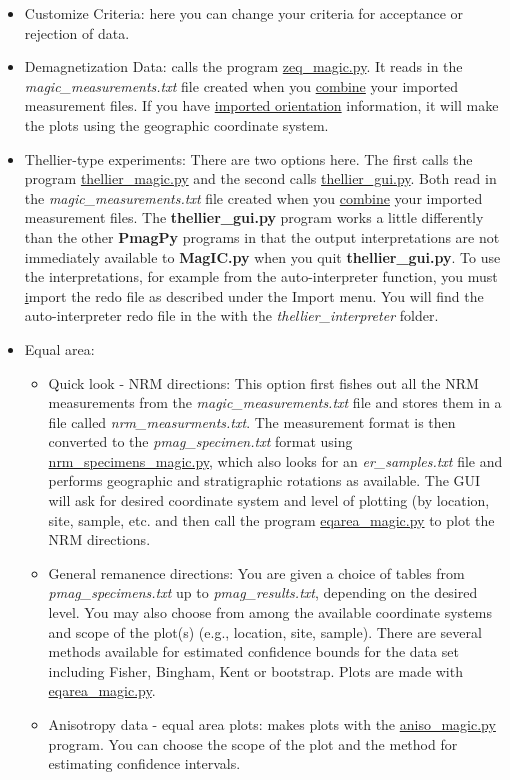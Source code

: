 \documentclass[11pt]{book}
\begin{document}
{
\begin{itemize}
\item Customize Criteria: here you can change your criteria for acceptance or rejection of data.
		\item Demagnetization Data:  calls the program \href{#zeq_magic.py}{zeq\_magic.py}.  It reads in the {\it magic\_measurements.txt} file created when you \href{#Combining_measurement_files}{combine} your imported  measurement files.  If you have \href{#ImportOrient }{imported orientation} information, it will make the plots using the geographic coordinate system. 
		\item Thellier-type experiments:  There are two options here.  The first calls the program \href{#thellier_magic.py}{thellier\_magic.py} and the second calls \href{#thellier_gui.py}{thellier\_gui.py}.  Both  read in the {\it magic\_measurements.txt} file created when you \href{#Combining_measurement_files}{combine} your imported  measurement files.   The {\bf thellier\_gui.py} program works a little differently than the other {\bf PmagPy} programs in that the output interpretations are   not immediately  available to {\bf MagIC.py} when you quit {\bf thellier\_gui.py}.  To use the interpretations, for example from  the auto-interpreter function, you must \href{#import_redo}  import the redo file as described under the Import menu.  You will find the auto-interpreter redo file in the  with the {\it thellier\_interpreter} folder.  
                  \item Equal area: 
		\begin{itemize}
			\item Quick look - NRM directions:  This option first fishes out all the NRM measurements from the {\it magic\_measurements.txt} file and stores them in a file called {\it nrm\_measurments.txt}.  The measurement format is then converted to the {\it pmag\_specimen.txt} format using \href{#nrm_specimens_magic.py}{nrm\_specimens\_magic.py}, which also looks for an {\it er\_samples.txt} file and  performs geographic and stratigraphic rotations as available. The GUI will ask for desired coordinate system and level of plotting (by location, site, sample, etc. and then  call the program \href{#eqarea_magic.py}{eqarea\_magic.py} to plot the NRM directions. 
			\item General remanence directions:  You are given a choice of tables from {\it pmag\_specimens.txt} up to {\it pmag\_results.txt}, depending on the desired level. You may also choose from among the available coordinate systems and scope of the plot(s) (e.g., location, site, sample).   There are several methods available for estimated confidence bounds for the data set including Fisher, Bingham, Kent or bootstrap.  Plots are made with \href{#eqarea_magic.py}{eqarea\_magic.py}.   
			\item Anisotropy data - equal area plots: makes plots with the \href{#aniso_magic.py}{aniso\_magic.py} program.  You can choose the scope of the plot and the method for estimating confidence intervals.  


\end{itemize}
\end{itemize}}
\end{document}
